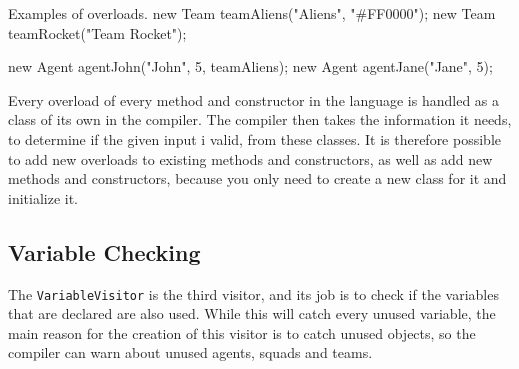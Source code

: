 \begin{source}{Examples of overloads.}{}
	new Team teamAliens("Aliens", "#FF0000");
	new Team teamRocket("Team Rocket");
	
	new Agent agentJohn("John", 5, teamAliens);
	new Agent agentJane("Jane", 5);
\end{source}

Every overload of every method and constructor in the language is handled as a class of its own in the compiler. 
The compiler then takes the information it needs, to determine if the given input i valid, from these classes. 
It is therefore possible to add new overloads to existing methods and constructors, as well as add new methods and constructors, because you only need to create a new class for it and initialize it.

\subsection{Variable Checking}
\label{variabelcheck}
The \texttt{VariableVisitor} is the third visitor, and its job is to check if the variables that are declared are also used. 
While this will catch every unused variable, the main reason for the creation of this visitor is to catch unused objects, so the compiler can warn about unused agents, squads and teams.